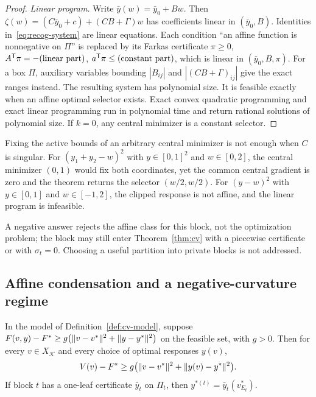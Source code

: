 \begin{proof}
\emph{Linear program.} Write $\bar y(w)=\bar y_0+Bw$. Then
$\zeta(w)=(C\bar y_0+c)+(CB+\Gamma)w$ has coefficients linear in
$(\bar y_0,B)$. Identities in~\eqref{eq:recog-system} are linear equations.
Each condition ``an affine function is nonnegative on $\Pi$'' is replaced by
its Farkas certificate $\pi\ge0$, $A^{\mathsf T}\pi=-(\text{linear part})$,
$a^{\mathsf T}\pi\le(\text{constant part})$, which is linear in $(\bar y_0,B,\pi)$.
For a box $\Pi$, auxiliary variables bounding $|B_{ij}|$ and
$|(CB+\Gamma)_{ij}|$ give the exact ranges instead. The resulting system has
polynomial size. It is feasible exactly when an affine optimal selector
exists. Exact convex quadratic programming \cite{KozlovTarasovKhachiyan1980}
and exact linear programming \cite{GrotschelLovaszSchrijver1988} run in
polynomial time and return rational solutions of polynomial size. If $k=0$,
any central minimizer is a constant selector.
\end{proof}

Fixing the active bounds of an arbitrary central minimizer is not enough
when $C$ is singular. For $(y_1+y_2-w)^2$ with $y\in[0,1]^2$ and
$w\in[0,2]$, the central minimizer $(0,1)$ would fix both coordinates, yet
the common central gradient is zero and the theorem returns the selector
$(w/2,w/2)$. For $(y-w)^2$ with $y\in[0,1]$ and $w\in[-1,2]$, the clipped
response is not affine, and the linear program is infeasible.

A negative answer rejects the affine class for this block, not the
optimization problem; the block may still enter Theorem~\ref{thm:cv} with a
piecewise certificate or with $\sigma_t=0$. Choosing a useful partition
into private blocks is not addressed.

\subsection{Affine condensation and a negative-curvature regime}

\begin{lemma}\label{lem:cv-growth}
In the model of Definition~\ref{def:cv-model}, suppose
$F(v,y)-F^{*}\ge g\bigl(\lVert v-v^*\rVert^2+\lVert y-y^*\rVert^2\bigr)$ on the feasible
set, with $g>0$. Then for every $v\in X_{\mathcal K}$ and every choice of
optimal responses $y(v)$,
\[
V(v)-F^{*}\ge g\bigl(\lVert v-v^*\rVert^2+\lVert y(v)-y^*\rVert^2\bigr).
\]
If block $t$ has a one-leaf certificate $\bar y_t$ on $\Pi_t$, then
$y^{*(t)}=\bar y_t(v^*_{E_t})$.
\end{lemma}

